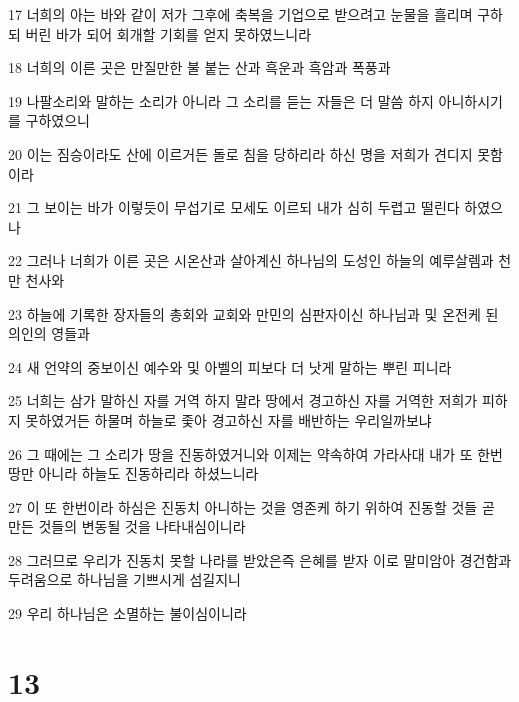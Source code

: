 \par 17 너희의 아는 바와 같이 저가 그후에 축복을 기업으로 받으려고 눈물을 흘리며 구하되 버린 바가 되어 회개할 기회를 얻지 못하였느니라
\par 18 너희의 이른 곳은 만질만한 불 붙는 산과 흑운과 흑암과 폭풍과
\par 19 나팔소리와 말하는 소리가 아니라 그 소리를 듣는 자들은 더 말씀 하지 아니하시기를 구하였으니
\par 20 이는 짐승이라도 산에 이르거든 돌로 침을 당하리라 하신 명을 저희가 견디지 못함이라
\par 21 그 보이는 바가 이렇듯이 무섭기로 모세도 이르되 내가 심히 두렵고 떨린다 하였으나
\par 22 그러나 너희가 이른 곳은 시온산과 살아계신 하나님의 도성인 하늘의 예루살렘과 천만 천사와
\par 23 하늘에 기록한 장자들의 총회와 교회와 만민의 심판자이신 하나님과 및 온전케 된 의인의 영들과
\par 24 새 언약의 중보이신 예수와 및 아벨의 피보다 더 낫게 말하는 뿌린 피니라
\par 25 너희는 삼가 말하신 자를 거역 하지 말라 땅에서 경고하신 자를 거역한 저희가 피하지 못하였거든 하물며 하늘로 좇아 경고하신 자를 배반하는 우리일까보냐
\par 26 그 때에는 그 소리가 땅을 진동하였거니와 이제는 약속하여 가라사대 내가 또 한번 땅만 아니라 하늘도 진동하리라 하셨느니라
\par 27 이 또 한번이라 하심은 진동치 아니하는 것을 영존케 하기 위하여 진동할 것들 곧 만든 것들의 변동될 것을 나타내심이니라
\par 28 그러므로 우리가 진동치 못할 나라를 받았은즉 은혜를 받자 이로 말미암아 경건함과 두려움으로 하나님을 기쁘시게 섬길지니
\par 29 우리 하나님은 소멸하는 불이심이니라

\chapter{13}

